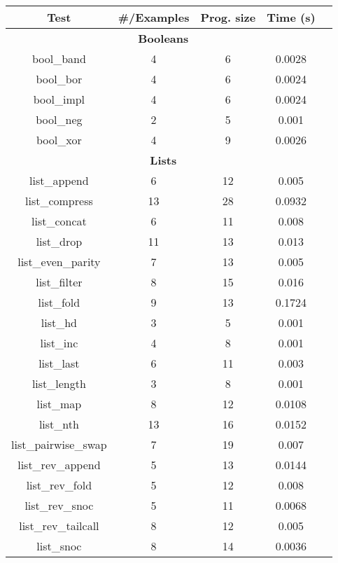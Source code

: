 \newcommand{\benchmarksCount}{ 42 }

\begin{table}
  \begin{center}
  \tabcolsep 5.8pt
  \footnotesize
  \begin{tabular}{|c|c|c|c|c|}
  \hline
  \textbf{Test} & \textbf{ \#/Examples } & \textbf{ Prog. size } & \textbf{Time (s)} \\
  \hline

\multicolumn{4}{|c|}{\textbf{Booleans}} \\
\hline
bool\_band & 4 & 6 & 0.0028 \\
\hline
bool\_bor & 4 & 6 & 0.0024 \\
\hline
bool\_impl & 4 & 6 & 0.0024 \\
\hline
bool\_neg & 2 & 5 & 0.001 \\
\hline
bool\_xor & 4 & 9 & 0.0026 \\
\hline
\multicolumn{4}{|c|}{\textbf{Lists}} \\
\hline
list\_append & 6 & 12 & 0.005 \\
\hline
list\_compress & 13 & 28 & 0.0932 \\
\hline
list\_concat & 6 & 11 & 0.008 \\
\hline
list\_drop & 11 & 13 & 0.013 \\
\hline
list\_even\_parity & 7 & 13 & 0.005 \\
\hline
list\_filter & 8 & 15 & 0.016 \\
\hline
list\_fold & 9 & 13 & 0.1724 \\
\hline
list\_hd & 3 & 5 & 0.001 \\
\hline
list\_inc & 4 & 8 & 0.001 \\
\hline
list\_last & 6 & 11 & 0.003 \\
\hline
list\_length & 3 & 8 & 0.001 \\
\hline
list\_map & 8 & 12 & 0.0108 \\
\hline
list\_nth & 13 & 16 & 0.0152 \\
\hline
list\_pairwise\_swap & 7 & 19 & 0.007 \\
\hline
list\_rev\_append & 5 & 13 & 0.0144 \\
\hline
list\_rev\_fold & 5 & 12 & 0.008 \\
\hline
list\_rev\_snoc & 5 & 11 & 0.0068 \\
\hline
list\_rev\_tailcall & 8 & 12 & 0.005 \\
\hline
list\_snoc & 8 & 14 & 0.0036 \\
\hline

\end{tabular}
\end{center}
\end{table}
